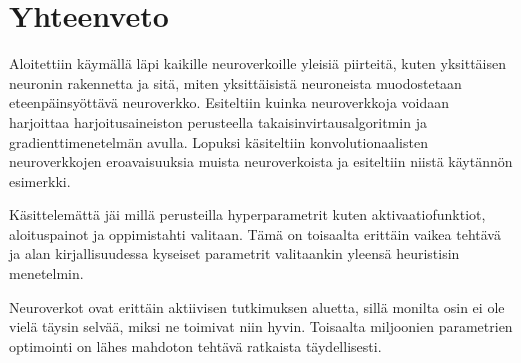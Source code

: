 \documentclass[finnish]{tktltiki2}
\theoremstyle{definition}
\theoremstyle{remark}
\begin{document}
\section{Yhteenveto} 

Aloitettiin käymällä läpi kaikille neuroverkoille yleisiä piirteitä, kuten yksittäisen neuronin rakennetta ja sitä, miten yksittäisistä neuroneista muodostetaan eteenpäinsyöttävä neuroverkko. Esiteltiin kuinka neuroverkkoja voidaan harjoittaa harjoitusaineiston perusteella takaisinvirtausalgoritmin ja gradienttimenetelmän avulla. Lopuksi käsiteltiin konvolutionaalisten neuroverkkojen eroavaisuuksia muista neuroverkoista ja esiteltiin niistä käytännön esimerkki.

Käsittelemättä jäi millä perusteilla hyperparametrit kuten aktivaatiofunktiot, aloituspainot ja oppimistahti valitaan. Tämä on toisaalta erittäin vaikea tehtävä ja alan kirjallisuudessa kyseiset parametrit valitaankin yleensä heuristisin menetelmin.

Neuroverkot ovat erittäin aktiivisen tutkimuksen aluetta, sillä monilta osin ei ole vielä täysin selvää, miksi ne toimivat niin hyvin. Toisaalta miljoonien parametrien optimointi on lähes mahdoton tehtävä ratkaista täydellisesti.


  
  





  
\end{document}
